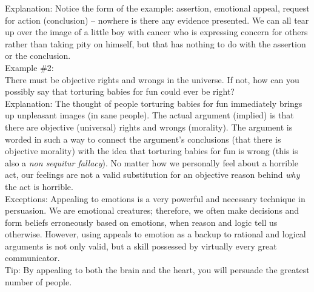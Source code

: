 \documentclass[a4paper,12pt,single,pdftex]{scrbook}
\begin{document}
{    
      Explanation: Notice the form of the example: assertion, emotional appeal, request for action (conclusion) -- nowhere is there any evidence presented.  We can all tear up over the image of a little boy with cancer who is expressing concern for others rather than taking pity on himself, but that has nothing to do with the assertion or the conclusion.
    \\

    
      Example \#2:
    \\

    
      There must be objective rights and wrongs in the universe.  If not, how can you possibly say that torturing babies for fun could ever be right?
    \\

    
      Explanation: The thought of people torturing babies for fun immediately brings up unpleasant images (in sane people).  The actual argument (implied) is that there are objective (universal) rights and wrongs (morality).  The argument is worded in such a way to connect the argument's conclusions (that there is objective morality) with the idea that torturing babies for fun is wrong (this is also a {\it non sequitur  fallacy}).  No matter how we personally feel about a horrible act, our feelings are not a valid substitution for an objective reason behind {\it why}  the act is horrible.
    \\

    
      Exceptions: Appealing to emotions is a very powerful and necessary technique in persuasion.  We are emotional creatures; therefore, we often make decisions and form beliefs erroneously based on emotions, when reason and logic tell us otherwise.  However, using appeals to emotion as a backup to rational and logical arguments is not only valid, but a skill possessed by virtually every great communicator. 
    \\

    
      Tip: By appealing to both the brain and the heart, you will persuade the greatest number of people.
    \\

  }
\end{document}
